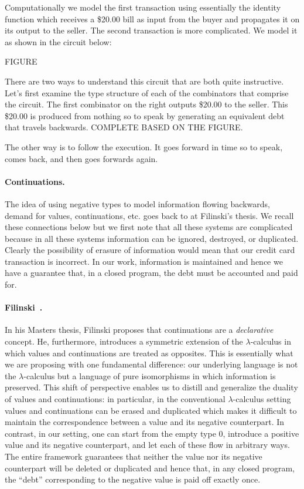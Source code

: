 \documentclass[preprint]{sigplanconf}
\begin{document}
Computationally we model the first transaction using essentially the identity
function which receives a \$20.00 bill as input from the buyer and propagates
it on its output to the seller. The second transaction is more
complicated. We model it as shown in the circuit below:

FIGURE

There are two ways to understand this circuit that are both quite
instructive. Let's first examine the type structure of each of the
combinators that comprise the circuit. The first combinator on the right
outputs \$20.00 to the seller. This \$20.00 is produced from nothing so to
speak by generating an equivalent debt that travels backwards. COMPLETE BASED
ON THE FIGURE.

The other way is to follow the execution. It goes forward in time so to speak,
comes back, and then goes forwards again.

\paragraph*{Continuations.} The idea of using negative types to model
information flowing backwards, demand for values, continuations, etc. goes
back to at Filinski's thesis. We recall these connections below but we first
note that all these systems are complicated because in all these systems
information can be ignored, destroyed, or duplicated. Clearly the possibility
of erasure of information would mean that our credit card transaction is
incorrect. In our work, information is maintained and hence we have a
guarantee that, in a closed program, the debt must be accounted and paid for.

\paragraph*{Filinski~\cite{Filinski:1989:DCI:648332.755574}.}
In his Masters thesis, Filinski proposes that continuations are a
\emph{declarative} concept. He, furthermore, introduces a symmetric extension
of the $\lambda$-calculus in which values and continuations are treated as
opposites. This is essentially what we are proposing with one fundamental
difference: our underlying language is not the $\lambda$-calculus but a
language of pure isomorphisms in which information is preserved. This shift
of perspective enables us to distill and generalize the duality of values and
continuations: in particular, in the conventional $\lambda$-calculus setting
values and continuations can be erased and duplicated which makes it
difficult to maintain the correspondence between a value and its negative
counterpart. In contrast, in our setting, one can start from the empty type
$0$, introduce a positive value and its negative counterpart, and let each of
these flow in arbitrary ways. The entire framework guarantees that neither
the value nor its negative counterpart will be deleted or duplicated and
hence that, in any closed program, the ``debt'' corresponding to the negative
value is paid off exactly once. 
\end{document}

